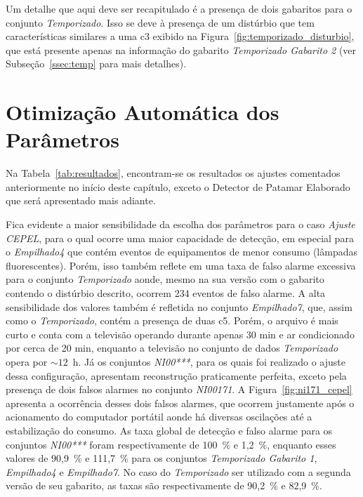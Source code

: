 Um detalhe que aqui deve ser recapitulado é a presença de dois
gabaritos para o conjunto \emph{Temporizado}. Isso se deve à presença
de um distúrbio que tem características similares a uma \acs{c3}
exibido na Figura~\ref{fig:temporizado_disturbio}, que está
presente apenas na informação do gabarito \emph{Temporizado Gabarito
2} (ver Subseção~\ref{ssec:temp} para mais detalhes).

\section{Otimização Automática dos Parâmetros}
\label{sec:otim_es}

Na Tabela~\ref{tab:resultados}, encontram-se os
resultados os ajustes comentados anteriormente no início deste
capítulo, exceto o Detector de Patamar Elaborado que será apresentado
mais adiante.

Fica evidente a maior sensibilidade da escolha dos parâmetros para o
caso \emph{Ajuste CEPEL}, para o qual ocorre uma maior capacidade de detecção,
em especial para o \emph{Empilhado4} que contém eventos de
equipamentos de menor consumo (lâmpadas fluorescentes). Porém, isso
também reflete em uma taxa de falso alarme excessiva para o conjunto
\emph{Temporizado} aonde, mesmo na sua versão com o gabarito contendo o
distúrbio descrito, ocorrem 234 eventos de falso alarme. A alta
sensibilidade dos valores também é refletida no conjunto
\emph{Empilhado7}, que, assim como o \emph{Temporizado}, contém a
presença de duas \acs{c5}. Porém, o arquivo é mais curto e conta com a
televisão operando durante apenas 30 min e ar condicionado por cerca
de 20 min, enquanto a televisão no conjunto de dados
\emph{Temporizado} opera por $\sim12$~h. Já os conjuntos
\emph{NI00***}, para os quais foi realizado o ajuste dessa
configuração, apresentam reconstrução praticamente perfeita, exceto
pela presença de dois falsos alarmes no conjunto \emph{NI00171}. A
Figura~\ref{fig:ni171_cepel} apresenta a ocorrência desses dois falsos
alarmes, que ocorrem justamente após o acionamento do computador
portátil aonde há diversas oscilações até a estabilização do consumo.
As taxa global de detecção e falso alarme para os conjuntos
\emph{NI00***} foram respectivamente de 100~\% e 1,2~\%, enquanto
esses valores de 90,9~\% e 111,7~\% para os conjuntos
\emph{Temporizado Gabarito 1}, \emph{Empilhado4} e \emph{Empilhado7}.
No caso do \emph{Temporizado} ser utilizado com a segunda versão de
seu gabarito, as taxas são respectivamente de 90,2~\% e 82,9~\%.


